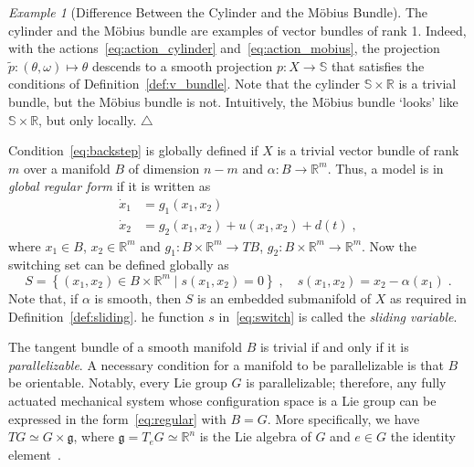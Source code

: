 \documentclass{article}
\theoremstyle{definition}
\theoremstyle{remark}
\newtheorem{example}{Example}
\newcommand\xqed[1]{%
  \leavevmode\unskip\penalty9999 \hbox{}\nobreak\hfill
  \quad\hbox{#1}}
\newcommand\eexa{\xqed{$\triangle$}}
\newcommand{\BA}{B}	%
\newcommand{\MA}{X}	%
\newcommand{\RR}{\mathbb{R}}	%
\newcommand{\SP}{\mathbb{S}}	%
\newcommand{\SW}{S}	%
\begin{document}
\begin{example}[Difference Between the Cylinder and the M\"obius Bundle] \label{exa:cyl_mob}
 The cylinder and the M\"obius bundle are examples of vector bundles of rank 1. Indeed, with the actions~\eqref{eq:action_cylinder}
 and~\eqref{eq:action_mobius}, the projection $\tilde{p} : (\theta,\omega) \mapsto \theta$ descends to a smooth
 projection $p : \MA \to \SP$ that satisfies the conditions of Definition~\ref{def:v_bundle}.
 Note that the cylinder $\SP\times\RR$ is a trivial bundle, but the M\"obius bundle is not. Intuitively, the M\"obius bundle `looks' 
 like $\SP\times\RR$, but only locally. \eexa
\end{example}

Condition~\eqref{eq:backstep} is globally defined if $\MA$ is a trivial vector bundle of rank $m$ over a manifold $\BA$
of dimension $n-m$ and $\alpha : \BA \to \RR^m$. Thus, a model is in \emph{global regular form} if it is written as
\begin{subequations} \label{eq:regular}
\begin{align}
 \dot{x}_1 &= g_1(x_1,x_2) \label{eq:reg1} \\
 \dot{x}_2 &= g_2(x_1,x_2) + u(x_1,x_2)+d(t) \;, \label{eq:reg2}
\end{align}
\end{subequations}
where $x_1 \in \BA$, $x_2 \in \RR^{m}$ and $g_1 :\BA\times\RR^m \to T\BA$, $g_2 :\BA\times\RR^m \to \RR^m$. Now the switching set
can be defined globally as
\begin{equation} \label{eq:switch}
 \SW = \left\{ (x_1,x_2) \in \BA\times\RR^m \mid s(x_1,x_2) = 0\right\} \;, \quad s(x_1,x_2) = x_2 - \alpha(x_1) \;.
\end{equation}
Note that, if $\alpha$ is smooth, then $\SW$ is an embedded submanifold of $\MA$ as required in Definition~\ref{def:sliding}.
he function $s$ in~\eqref{eq:switch} is called the \emph{sliding variable}.

The tangent bundle of a smooth manifold $\BA$ is trivial if and only if it is \emph{parallelizable}. A necessary condition for
a manifold to be parallelizable is that $\BA$ be orientable. Notably, every Lie group $G$ is parallelizable; therefore, any fully actuated
mechanical system whose configuration space is a Lie group can be expressed in the form~\eqref{eq:regular} with $\BA = G$. More
specifically, we have $TG \simeq G \times \mathfrak{g}$, where $\mathfrak{g} = T_e G \simeq \RR^n$ is the Lie algebra of $G$ and $e \in G$
the identity element~\cite{lee}.
\end{document}
